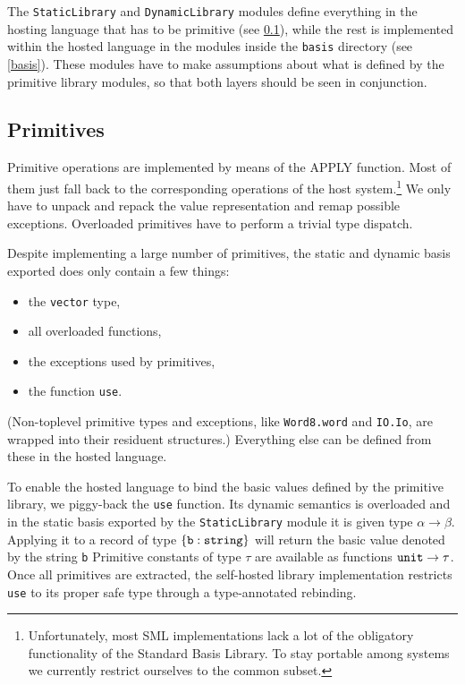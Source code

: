 \documentclass[twoside,titlepage]{article}
\begin{document}
The {\tt StaticLibrary} and {\tt DynamicLibrary} modules define everything in the hosting language that has to be primitive (see \ref{primitives}), while the rest is implemented within the hosted language in the modules inside the {\tt basis} directory (see \ref{basis}). These modules have to make assumptions about what is defined by the primitive library modules, so that both layers should be seen in conjunction.


\subsection{Primitives}
\label{primitives}

Primitive operations are implemented by means of the APPLY function. Most of them just fall back to the corresponding operations of the host system.\footnote{Unfortunately, most SML implementations lack a lot of the obligatory functionality of the Standard Basis Library. To stay portable among systems we currently restrict ourselves to the common subset.} We only have to unpack and repack the value representation and remap possible exceptions. 
Overloaded primitives have to perform a trivial type dispatch.

Despite implementing a large number of primitives, the static and dynamic basis exported does only contain a few things:

\begin{itemize}[nolistsep]
\item the {\tt vector} type,
\item all overloaded functions,
\item the exceptions used by primitives,
\item the function {\tt use}.
\end{itemize}

(Non-toplevel primitive types and exceptions, like {\tt Word8.word} and {\tt IO.Io}, are wrapped into their residuent structures.) Everything else can be defined from these in the hosted language.

To enable the hosted language to bind the basic values defined by the primitive library, we piggy-back the {\tt use} function. Its dynamic semantics is overloaded and in the static basis exported by the {\tt StaticLibrary} module it is given type {\tt $\alpha\to\beta$}. Applying it to a record of type $\{{\tt{b}}:{\tt{string}}\}$ will return the basic value denoted by the string {\tt b} Primitive constants of type $\tau$ are available as functions ${\tt unit}\to\tau$. Once all primitives are extracted, the self-hosted library implementation restricts {\tt use} to its proper safe type through a type-annotated rebinding.
\end{document}
